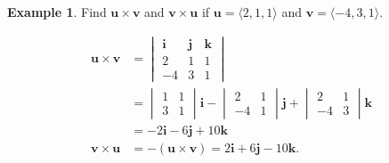 \documentclass[12pt, letter]{article}
\theoremstyle{plain}
\numberwithin{theorem}{section}
\theoremstyle{definition}
\newtheorem{example}[theorem]{Example}
\begin{document}
\bigskip

\hrulefill

\bigskip

\begin{example}
Find $\bm{u} \times \bm{v}$ and $\bm{v} \times \bm{u}$ if $\bm{u} = \langle 2, 1, 1 \rangle$ and $\bm{v} = \langle -4, 3, 1 \rangle$.\\

\smallskip

\begin{align*}
\bm{u} \times \bm{v} &= \begin{vmatrix} \bm{i} & \bm{j} & \bm{k} \\ 2 & 1 & 1 \\ -4 & 3 & 1 \end{vmatrix}\\
&= \begin{vmatrix} 1 & 1 \\ 3 & 1 \end{vmatrix}\bm{i} - \begin{vmatrix} 2 & 1 \\ -4 & 1 \end{vmatrix}\bm{j} + \begin{vmatrix} 2 & 1 \\ -4 & 3 \end{vmatrix}\bm{k}\\
&= -2\bm{i} - 6\bm{j} + 10\bm{k}\\
\bm{v} \times \bm{u} &= -(\bm{u} \times \bm{v}) = 2\bm{i} + 6\bm{j} -10\bm{k}.
\end{align*}
\end{example}

\bigskip

\hrulefill

\bigskip
\end{document}
